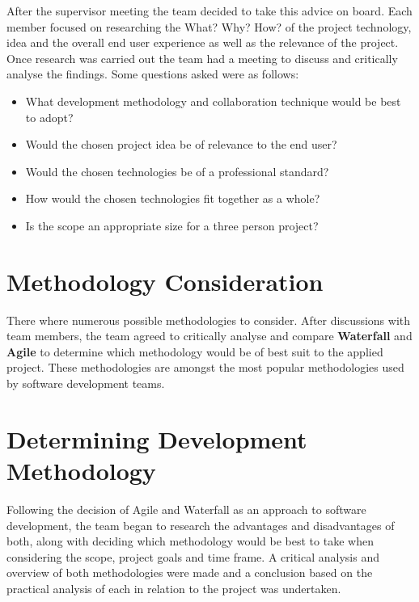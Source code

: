 \vspace{5mm} %

After the supervisor meeting the team decided to take this advice on board. Each member focused on researching the What? Why? How? of the project technology, idea and the overall end user experience as well as the relevance of the project. Once research was carried out the team had a meeting to discuss and critically analyse the findings. Some questions asked were as follows:

\begin{itemize}

    \item {What development methodology and collaboration technique would be best to adopt?}

    \item{Would the chosen project idea be of relevance to the end user?}

     \item{Would the chosen technologies be of a professional standard?}

    \item{How would the chosen technologies fit together as a whole?}

    \item{Is the scope an appropriate size for a three person project?}

\end{itemize}

\section{Methodology Consideration}
There where numerous possible methodologies to consider. After discussions with team members, the team agreed to critically analyse and compare \textbf{Waterfall} and \textbf{Agile} to determine which methodology would be of best suit to the applied project. These methodologies are amongst the most popular methodologies used by software development teams.


\vspace{70mm} %


\section{Determining Development Methodology}
Following the decision of Agile and Waterfall as an approach to software development, the team began to research the advantages and disadvantages of both, along with deciding which methodology would be best to take when considering the scope, project goals and time frame. A critical analysis and overview of both methodologies were made and a conclusion based on the practical analysis of each in relation to the project was undertaken.

